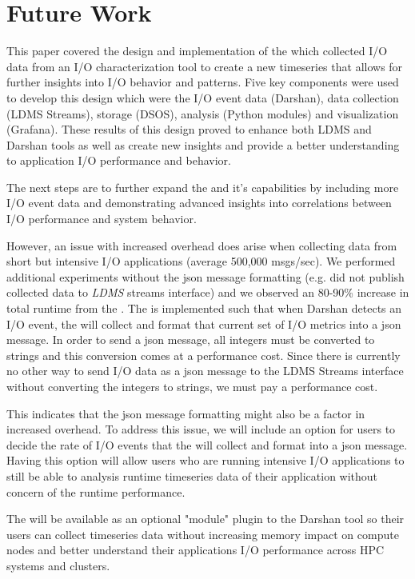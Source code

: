 \section{Future Work}
\label{sec:conclusion}
This paper covered the \Darshan{} design and implementation of the \connector{} which collected I/O data from an I/O characterization tool to create a new timeseries that allows for further insights into I/O behavior and patterns. Five key components were used to develop this design which were the I/O event data (Darshan), data collection (LDMS Streams), storage (DSOS), analysis (Python modules) and visualization (Grafana).
These results of this design proved to enhance both LDMS and Darshan tools as well as create new insights and provide a better understanding to application I/O performance and behavior. 

The next steps are to further expand the \connector{} and it's capabilities by including more I/O event data and demonstrating advanced insights into correlations between I/O performance and system behavior. 

However, an issue with increased overhead does arise when collecting data
from short but intensive I/O applications (average 500,000 msgs/sec). We performed additional experiments without the json message formatting (e.g. did not publish collected data to \emph{LDMS} streams interface) and we observed an 80-90\% increase in total runtime from the \connector{}. 
The \connector{} is implemented such that when Darshan detects an I/O event, the \connector{} will collect and format that current set of I/O metrics into a json message. In order to send a json message, all integers must be converted to strings and this conversion comes at a performance cost. Since there is currently no other way to send I/O data as a json message to the LDMS Streams interface without converting the integers to strings, we must pay a performance cost.

This indicates that the json message formatting might also be a factor in increased overhead.
To address this issue, we will include an option for users to decide the rate of I/O events that the \connector{} will collect and format into a json message. Having this option will allow users who are running intensive I/O applications to still be able to analysis runtime timeseries data of their application without concern of the runtime performance. 

The \Darshan{} will be available as an optional "module" plugin to the Darshan tool so their users can collect timeseries data without increasing memory impact on compute nodes and better understand their applications I/O performance across HPC systems and clusters. 

